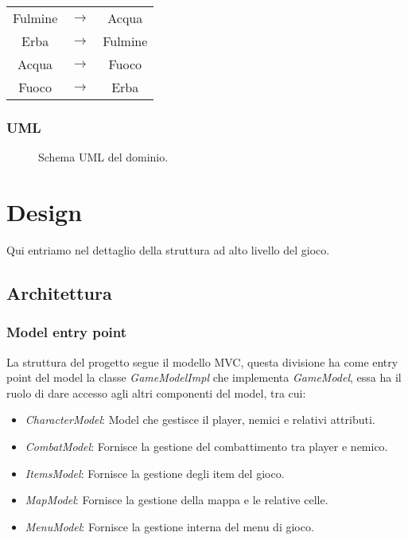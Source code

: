 \documentclass[a4paper,12pt]{report}
\begin{document}
\begin{center}
\begin{tabular}{ c c c }
    Fulmine & $\rightarrow$ & Acqua \\
    Erba & $\rightarrow$ & Fulmine \\
    Acqua & $\rightarrow$ & Fuoco \\
    Fuoco & $\rightarrow$ & Erba \\
\end{tabular}
\end{center}

\subsection{UML}
\begin{figure}[H]
	\centering
	
	\caption{Schema UML del dominio.} \label{fig:Schema UML del dominio.}
\end{figure}

\chapter{Design}

Qui entriamo nel dettaglio della struttura ad alto livello del gioco.

\section{Architettura}
\subsection{Model entry point}
La struttura del progetto segue il modello MVC, questa divisione ha come entry point del model la classe \textit{GameModelImpl} che implementa \textit{GameModel}, essa ha il ruolo di dare accesso agli altri componenti del model, tra cui:
\begin{itemize}
	\item \textit{CharacterModel}: Model che gestisce il player, nemici e relativi attributi.
	\item \textit{CombatModel}: Fornisce la gestione del combattimento tra player e nemico.
	\item \textit{ItemsModel}: Fornisce la gestione degli item del gioco.
	\item \textit{MapModel}: Fornisce la gestione della mappa e le relative celle.
	\item \textit{MenuModel}: Fornisce la gestione interna del menu di gioco.
\end{itemize}
\end{document}
